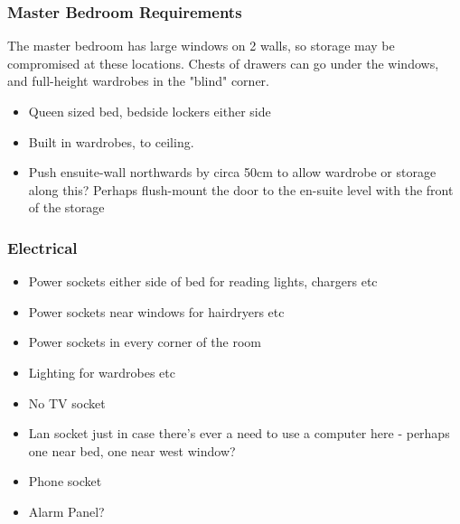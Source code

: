 \subsubsection{Master Bedroom Requirements}
The master bedroom has large windows on 2 walls, so storage may be compromised at these locations. 
Chests of drawers can go under the windows, and full-height wardrobes in the "blind" corner.

\begin{itemize}
\item Queen sized bed, bedside lockers either side
\item Built in wardrobes, to ceiling.
\item Push ensuite-wall northwards by circa 50cm to allow wardrobe or storage along this? Perhaps flush-mount the door to the en-suite level with the front of the storage

\end{itemize}

\subsubsection{Electrical}
\begin{itemize}
\item Power sockets either side of bed for reading lights, chargers etc
\item Power sockets near windows for hairdryers etc
\item Power sockets in every corner of the room
\item Lighting for wardrobes etc
\item No TV socket
\item Lan socket just in case there's ever a need to use a computer here - perhaps one near bed, one near west window?
\item Phone socket
\item Alarm Panel?
\end{itemize}
